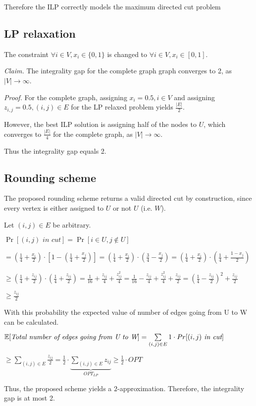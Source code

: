 Therefore the ILP correctly models the maximum directed cut problem


\subsection*{LP relaxation}

The constraint $\forall i \in V, x_i \in \{0, 1\}$ is changed to $\forall i \in V, x_i \in [0, 1]$.

\textit{Claim.} 
The integrality gap for the complete graph graph converges to 2, as $|V| \rightarrow \infty$.

\textit{Proof.}
For the complete graph, assigning $x_i = 0.5, i \in V$ and assigning $z_{i,j} = 0.5, (i, j) \in E$ for the LP relaxed problem yields $\frac{|E|}{2}$. 

However, the best ILP solution is assigning half of the nodes to $U$, which converges to $\frac{|E|}{4}$ for the complete graph, as $|V| \rightarrow \infty$.

Thus the integrality gap equals 2.

\subsection*{Rounding scheme}

The proposed rounding scheme returns a valid directed cut by construction, since every vertex is either assigned to $U$ or not $U$ (i.e. $W$). 

Let $(i, j) \in E$ be arbitrary.

$
\Pr[(i, j) \textit{ in cut}] = 
\Pr[i \in U, j \notin U]
$

$ =
\left(\frac{1}{4} + \frac{x_i}{2}\right) \cdot \left[1 - \left(\frac{1}{4} + \frac{x_j}{2}\right)\right] =
\left(\frac{1}{4} + \frac{x_i}{2}\right) \cdot \left(\frac{3}{4} - \frac{x_j}{2}\right) =
\left(\frac{1}{4} + \frac{x_i}{2}\right) \cdot \left(\frac{1}{4} + \frac{1 - x_j}{2}\right) 
$

$ \geq
\left(\frac{1}{4} + \frac{z_{ij}}{2}\right) \cdot \left(\frac{1}{4} + \frac{z_{ij}}{2}\right) = 
\frac{1}{16} + \frac{z_{ij}}{4} + \frac{z_{ij}^2}{4} = 
\frac{1}{16} - \frac{z_{ij}}{4} + \frac{z_{ij}^2}{4} + \frac{z_{ij}}{2} =
\left(\frac{1}{4} - \frac{z_{ij}}{2}\right)^2  + \frac{z_{ij}}{2} 
$

$\geq
\frac{z_{ij}}{2} 
$

With this probability the expected value of number of edges going from U to W can be calculated.

$
\mathbb{E}[\textit{Total number of edges going from U to W}] = 
\sum\limits_{(i, j) \in E}  1\cdot Pr[(i, j) \textit{ in cut}]
$

$ \geq
\sum\limits_{(i, j) \in E} \frac{z_{ij}}{2} = 
\frac{1}{2} \cdot \underbrace{\sum\limits_{(i, j) \in E} z_{ij}}_{OPT_{LP}} \geq
\frac{1}{2} \cdot OPT
$

Thus, the proposed scheme yields a $2$-approximation. Therefore, the integrality gap is at most 2.

\pagebreak 